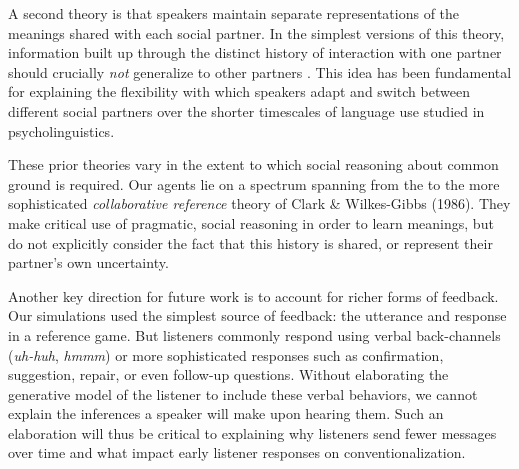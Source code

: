 A second theory is that speakers maintain separate representations of the meanings shared with each social partner. 
In the simplest versions of this theory, information built up through the distinct history of interaction with one partner should crucially \emph{not} generalize to other partners \cite{clark_using_1996,brennan_partner-specific_2009,horton_revisiting_2016}.
This idea has been fundamental for explaining the flexibility with which speakers adapt and switch between different social partners \cite{ClarkWilkesGibbs86_ReferringCollaborative,MetzingBrennan03_PartnerSpecificPacts} over the shorter timescales of language use studied in psycholinguistics.

These prior theories vary in the extent to which social reasoning about common ground is required. 
Our agents lie on a spectrum spanning from the to the more sophisticated \emph{collaborative reference} theory of Clark \& Wilkes-Gibbs (1986).%
They make critical use of pragmatic, social reasoning in order to learn meanings, but do not explicitly consider the fact that this history is shared, or represent their partner's own uncertainty.

Another key direction for future work is to account for richer forms of feedback.
Our simulations used the simplest source of feedback: the utterance and response in a reference game.
But listeners commonly respond using verbal back-channels (\emph{uh-huh}, \emph{hmmm}) or more sophisticated responses such as confirmation, suggestion, repair, or even follow-up questions. 
Without elaborating the generative model of the listener to include these verbal behaviors, we cannot explain the inferences a speaker will make upon hearing them.
Such an elaboration will thus be critical to explaining why listeners send fewer messages over time and what impact early listener responses on conventionalization. 

%
